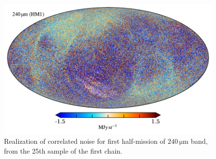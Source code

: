 \documentclass{aa}
\begin{document}
\begin{figure}
	\centering
	\includegraphics[width=\linewidth]{figs/ncorr_240a.pdf}
	\caption{Realization of correlated noise for first half-mission of $240\,\mathrm{\mu m}$ band, from the 25th sample of the first chain.}
  \label{fig:ncorr_map}
\end{figure}
\end{document}
